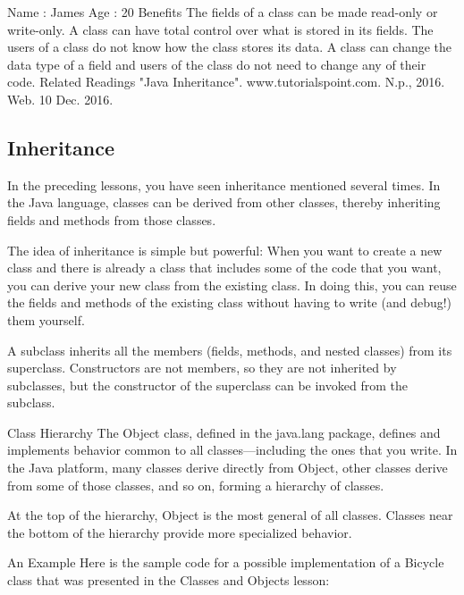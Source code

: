 Name : James Age : 20
Benefits
The fields of a class can be made read-only or write-only.
A class can have total control over what is stored in its fields.
The users of a class do not know how the class stores its data. A class can change the data type of a field and users of the class do not need to change any of their code.
Related Readings
"Java Inheritance". www.tutorialspoint.com. N.p., 2016. Web. 10 Dec. 2016.

\subsection{Inheritance}

In the preceding lessons, you have seen inheritance mentioned several times. In the Java language, classes can be derived from other classes, thereby inheriting fields and methods from those classes.

The idea of inheritance is simple but powerful: When you want to create a new class and there is already a class that includes some of the code that you want, you can derive your new class from the existing class. In doing this, you can reuse the fields and methods of the existing class without having to write (and debug!) them yourself.

A subclass inherits all the members (fields, methods, and nested classes) from its superclass. Constructors are not members, so they are not inherited by subclasses, but the constructor of the superclass can be invoked from the subclass.

Class Hierarchy
The Object class, defined in the java.lang package, defines and implements behavior common to all classes—including the ones that you write. In the Java platform, many classes derive directly from Object, other classes derive from some of those classes, and so on, forming a hierarchy of classes.


At the top of the hierarchy, Object is the most general of all classes. Classes near the bottom of the hierarchy provide more specialized behavior.

An Example
Here is the sample code for a possible implementation of a Bicycle class that was presented in the Classes and Objects lesson:

